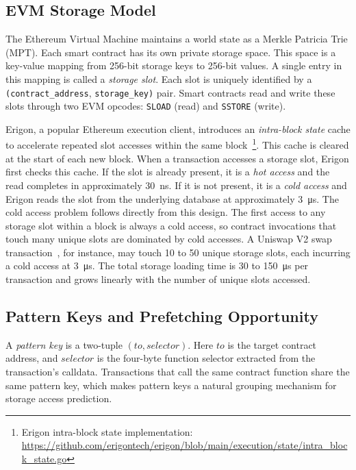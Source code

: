 \documentclass[conference]{IEEEtran}
\begin{document}
\subsection{EVM Storage Model}
\label{sec:evm-storage}

The Ethereum Virtual Machine maintains a world state as a Merkle Patricia Trie (MPT).
Each smart contract has its own private storage space. This space is a key-value mapping
from 256-bit storage keys to 256-bit values. A single entry in this mapping is called a
\textit{storage slot}. Each slot is uniquely identified by a
\texttt{(contract\_address}, \texttt{storage\_key)} pair. Smart contracts read and write
these slots through two EVM opcodes: \texttt{SLOAD} (read) and \texttt{SSTORE} (write).

Erigon, a popular Ethereum execution client, introduces an \textit{intra-block state}
cache to accelerate repeated slot accesses within the same block~\footnote{Erigon
intra-block state implementation:
\url{https://github.com/erigontech/erigon/blob/main/execution/state/intra_block_state.go}}.
This cache is cleared at the start of each new block.
When a transaction accesses a storage slot, Erigon first checks this cache. If the slot
is already present, it is a \textit{hot access} and the read completes in approximately
\qty{30}{\nano\second}. If it is not present, it is a \textit{cold access} and Erigon reads the slot from
the underlying database at approximately \qty{3}{\micro\second}.
The cold access problem follows directly from this design. The first access to any
storage slot within a block is always a cold access, so contract invocations that touch
many unique slots are dominated by cold accesses. A Uniswap V2 swap
transaction~\cite{uniswapv2}, for instance, may touch 10 to 50 unique storage slots, each incurring a
cold access at \qty{3}{\micro\second}. The total storage loading time is 30 to \qty{150}{\micro\second} per
transaction and grows linearly with the number of unique slots accessed.

\subsection{Pattern Keys and Prefetching Opportunity}
\label{sec:pattern-keys}

A \textit{pattern key} is a two-tuple $(to, selector)$. Here $to$ is the target
contract address, and $selector$ is the four-byte function selector extracted from the
transaction's calldata. Transactions that call the same contract function share the same
pattern key, which makes pattern keys a natural grouping mechanism for storage
access prediction.
\end{document}
